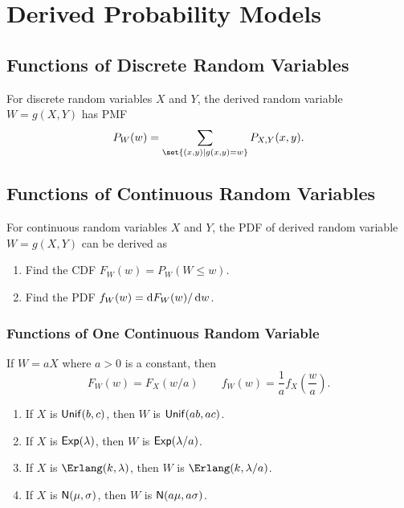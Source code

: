 \chapter{Derived Probability Models}

\section{Functions of Discrete Random Variables}
\begin{theorem}
    For discrete random variables $X$ and $Y$, the derived random variable $W=g(X,Y)$ has \textnormal{PMF}
    \[P_W(w)=\sum_{\set{(x,y) \mid g(x,y)=w}}P_{X,Y}(x,y).\]
\end{theorem}

\section{Functions of Continuous Random Variables}
\begin{theorem}\label{thm:pdf_of_derived_rv}
    For continuous random variables $X$ and $Y$, the \textnormal{PDF} of derived random variable $W=g(X,Y)$ can be derived as
    \begin{enumerate}
        \item Find the \textnormal{CDF} $F_W(w)=P_W(W\leq w)$.
        \item Find the \textnormal{PDF} $f_W(w)=\mathop{}\!\mathrm{d} F_W(w)/\mathop{}\!\mathrm{d} w$.
    \end{enumerate}
\end{theorem}

\subsection{Functions of One Continuous Random Variable}
\begin{theorem}
    If $W=aX$ where $a>0$ is a constant, then
    \[F_W(w)=F_X(w/a) \qquad f_W(w)=\frac{1}{a}f_X(\frac{w}{a}).\]
    \begin{enumerate}
        \item If $X$ is $\mathsf{Unif}(b,c)$, then $W$ is $\mathsf{Unif}(ab,ac)$.
        \item If $X$ is $\mathsf{Exp}(\lambda)$, then $W$ is $\mathsf{Exp}(\lambda/a)$.
        \item If $X$ is $\Erlang(k,\lambda)$, then $W$ is $\Erlang(k,\lambda/a)$.
        \item If $X$ is $\mathsf{N}(\mu,\sigma)$, then $W$ is $\mathsf{N}(a\mu,a\sigma)$.
    \end{enumerate}
\end{theorem}

